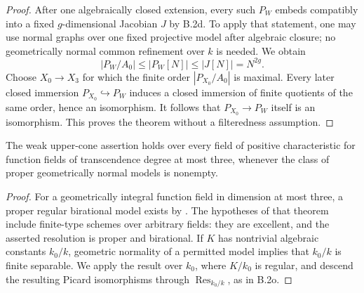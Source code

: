 \begin{proof}
After one algebraically closed extension, every such $P_W$
embeds compatibly into a fixed $g$-dimensional Jacobian $J$ by
B.2d.  To apply that statement, one may use normal graphs over
one fixed projective model after algebraic closure; no
geometrically normal common refinement over $k$ is needed.
We obtain
\[
       |P_W/A_0|\le |P_W[N]|\le |J[N]|=N^{2g}.
\]
Choose $X_0\to X_3$ for which the finite order $|P_{X_0}/A_0|$
is maximal.  Every later closed immersion
$P_{X_0}\hookrightarrow P_W$ induces a closed immersion of
finite quotients of the same order, hence an isomorphism.
It follows that $P_{X_0}\to P_W$ itself is an isomorphism.
This proves the theorem without a filteredness assumption.
\end{proof}

\begin{corollary}
The weak upper-cone assertion holds over every field of positive
characteristic for function fields of transcendence degree at most
three, whenever the class of proper geometrically normal models
is nonempty.
\end{corollary}
\begin{proof}
For a geometrically integral function field in dimension at most
three, a proper regular birational model exists by
\cite[Theorem 1.1, pp.~3--4 of the author manuscript]{CossartPiltant2019B}.
The hypotheses of that theorem include finite-type schemes over
arbitrary fields: they are excellent, and the asserted resolution
is proper and birational.
If $K$ has nontrivial algebraic constants $k_0/k$, geometric
normality of a permitted model implies that $k_0/k$ is finite
separable.  We apply the result over $k_0$, where $K/k_0$ is
regular, and descend the resulting Picard isomorphisms through
$\operatorname{Res}_{k_0/k}$, as in B.2o.
\end{proof}
